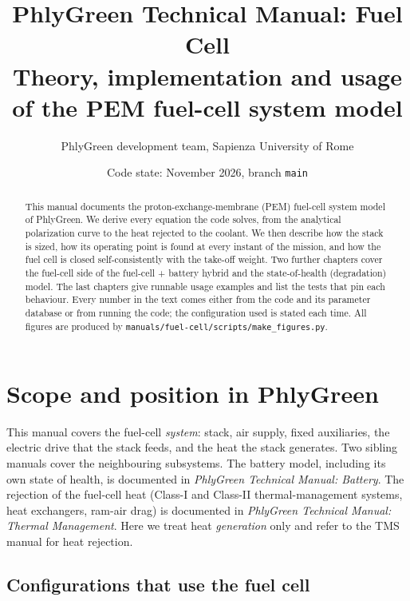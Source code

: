 \documentclass[a4paper,11pt]{article}
\title{PhlyGreen Technical Manual: Fuel Cell\\[4pt]
\large Theory, implementation and usage of the PEM fuel-cell system model}
\author{PhlyGreen development team, Sapienza University of Rome}
\date{Code state: November 2026, branch \texttt{main}}
\newcommand{\fn}[1]{\nolinkurl{#1}}
\begin{document}
\maketitle

\begin{abstract}
This manual documents the proton-exchange-membrane (PEM) fuel-cell system model of PhlyGreen.
We derive every equation the code solves, from the analytical polarization curve to the heat
rejected to the coolant. We then describe how the stack is sized, how its operating point is
found at every instant of the mission, and how the fuel cell is closed self-consistently with
the take-off weight. Two further chapters cover the fuel-cell side of the fuel-cell + battery
hybrid and the state-of-health (degradation) model. The last chapters give runnable usage
examples and list the tests that pin each behaviour. Every number in the text comes either
from the code and its parameter database or from running the code; the configuration used is
stated each time. All figures are produced by \fn{manuals/fuel-cell/scripts/make_figures.py}.
\end{abstract}

\tableofcontents
\clearpage

\section{Scope and position in PhlyGreen}
\label{sec:scope}

This manual covers the fuel-cell \emph{system}: stack, air supply, fixed auxiliaries, the
electric drive that the stack feeds, and the heat the stack generates. Two sibling manuals
cover the neighbouring subsystems. The battery model, including its own state of health, is
documented in \emph{PhlyGreen Technical Manual: Battery}. The rejection of the fuel-cell heat
(Class-I and Class-II thermal-management systems, heat exchangers, ram-air drag) is documented
in \emph{PhlyGreen Technical Manual: Thermal Management}. Here we treat heat
\emph{generation} only and refer to the TMS manual for heat rejection.

\subsection{Configurations that use the fuel cell}
\end{document}
